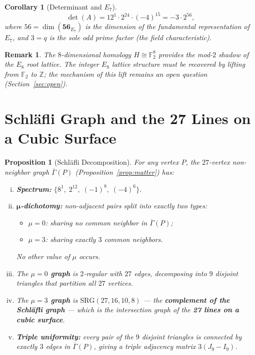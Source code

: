 \documentclass[12pt,a4paper]{article}
\newtheorem{proposition}[theorem]{Proposition}
\newtheorem{corollary}[theorem]{Corollary}
\newtheorem{remark}[theorem]{Remark}
\begin{document}
\begin{corollary}[Determinant and $E_7$]\label{cor:det}
\[
  \det(A) = 12^1 \cdot 2^{24} \cdot (-4)^{15}
  = -3 \cdot 2^{56},
\]
where $56 = \dim(\mathbf{56}_{E_7})$ is the dimension of the
fundamental representation of $E_7$, and $3 = q$ is the sole odd
prime factor (the field characteristic).
\end{corollary}

\begin{remark}
The $8$-dimensional homology $H \cong \mathbb{F}_2^8$ provides the
\emph{mod-$2$ shadow} of the $E_8$ root lattice.  The integer
$E_8$ lattice structure must be recovered by lifting from
$\mathbb{F}_2$ to $\mathbb{Z}$; the mechanism of this lift
remains an open question (Section~\ref{sec:open}).
\end{remark}

\section{Schl\"afli Graph and the 27 Lines on a Cubic Surface}
\label{sec:schlafli}

\begin{proposition}[Schl\"afli Decomposition]\label{prop:schlafli}
For any vertex $P$, the $27$-vertex non-neighbor graph
$\overline{\Gamma}(P)$ (Proposition~\ref{prop:matter}) has:
\begin{enumerate}[(i)]
  \item \textbf{Spectrum:} $\{8^1,\; 2^{12},\; ({-}1)^8,\; ({-}4)^6\}$.
  \item \textbf{$\boldsymbol{\mu}$-dichotomy:} non-adjacent pairs
        split into exactly two types:
        \begin{itemize}
          \item $\mu = 0$: sharing \emph{no} common neighbor in
                $\overline{\Gamma}(P)$;
          \item $\mu = 3$: sharing exactly $3$ common neighbors.
        \end{itemize}
        No other value of $\mu$ occurs.
  \item The \textbf{$\mu = 0$ graph} is $2$-regular with $27$ edges,
        decomposing into $9$ disjoint triangles that partition
        all $27$ vertices.
  \item The \textbf{$\mu = 3$ graph} is $\mathrm{SRG}(27,16,10,8)$
        --- the \textbf{complement of the Schl\"afli graph} ---
        which is the intersection graph of the
        \textbf{27 lines on a cubic surface}.
  \item \textbf{Triple uniformity:} every pair of the $9$ disjoint
        triangles is connected by exactly $3$ edges in
        $\overline{\Gamma}(P)$, giving a triple adjacency matrix
        $3(J_9 - I_9)$.
\end{enumerate}
\end{proposition}
\end{document}
